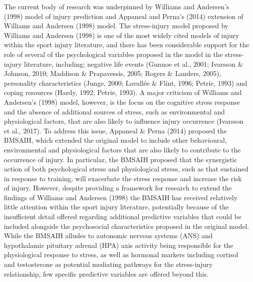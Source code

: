 \documentclass[
  english,
  man,floatsintext]{apa6}
\begin{document}
The current body of research was underpinned by Williams and Andersen's (1998) model of injury prediction and Appaneal and Perna's (2014) extension of Williams and Andersen (1998) model.
The stress-injury model proposed by Williams and Andersen (1998) is one of the most widely cited models of injury within the sport injury literature, and there has been considerable support for the role of several of the psychological variables proposed in the model in the stress-injury literature, including; negative life events (Gunnoe et al., 2001; Ivarsson \& Johnson, 2010; Maddison \& Prapavessis, 2005; Rogers \& Landers, 2005),
personality characteristics (Junge, 2000; Lavallée \& Flint, 1996; Petrie, 1993) and
coping resources (Hardy, 1992; Petrie, 1993).
A major criticism of Williams and Andersen's (1998) model, however, is the focus on the cognitive stress response and the absence of additional sources of stress, such as environmental and physiological factors, that are also likely to influence injury occurrence (Ivarsson et al., 2017).
To address this issue, Appaneal \& Perna (2014) proposed the BMSAIH, which extended the original model to include other behavioural, environmental and physiological factors that are also likely to contribute to the occurrence of injury.
In particular, the BMSAIH proposed that the synergistic action of both psychological stress and physiological stress, such as that sustained in response to training, will exacerbate the stress response and increase the risk of injury.
However, despite providing a framework for research to extend the findings of Williams and Andersen (1998) the BMSAIH has received relatively little attention within the sport injury literature, potentially because of the insufficient detail offered regarding additional predictive variables that could be included alongside the psychosocial characteristics proposed in the original model.
While the BMSAIH alludes to autonomic nervous systems (ANS) and hypothalamic pituitary adrenal (HPA) axis activity being responsible for the physiological response to stress, as well as hormonal markers including cortisol and testosterone as potential mediating pathways for the stress-injury relationship, few specific predictive variables are offered beyond this.
\end{document}
